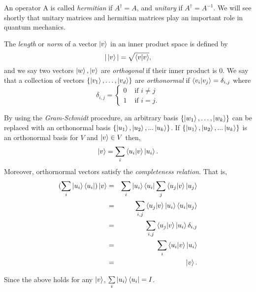 {An operator A is called \textit{hermitian} if $A^\dagger = A$, and \textit{unitary} if $A^\dagger =A^{-1}$. We will see shortly that unitary matrices and hermitian matrices play an important role in quantum mechanics.

The \textit{length} or \textit{norm} of a vector $\ket{v}$ in an inner product space is defined by
\begin{equation}
    |\ket{v}|=\sqrt{\braket{v|v}},
\end{equation}
and we say two vectors $\ket{w}, \ket{v}$ are \textit{orthogonal} if their inner product is 0.  We say that a collection of vectors $\{\ket{v_1},\hdots,\ket{v_d}\}$  are \textit{orthonormal} if $\braket{v_i | v_j}={\delta}_{i,j}$ where 
$${\delta}_{i,j}=
\begin{cases} 0 & \textrm{ if }i\neq j\\
1 & \textrm{ if } i=j.
\end{cases}$$


By using the \textit{Gram-Schmidt} procedure, an arbitrary basis $\{\ket{w_1},\hdots,\ket{w_k}\}$ can be replaced with an orthonormal basis $\{\ket{u_1}, \ket{u_2}, ...\ket{u_k}\}$.  If $\{\ket{u_1}, \ket{u_2}, ...\ket{u_k}\}$ is an orthonormal basis for $V$ and $\ket{v} \in V$ then, 
$$\ket{v}=\sum\limits_i\braket{u_i|v}\ket{u_i} .$$
Moreover, orthornormal vectors satisfy the \textit{completeness relation}.  That is, 
\begin{eqnarray*}
    (\sum_i \ket{u_i}\bra{u_i})\ket{v}&=&
    \sum_i \ket{u_i}\bra{u_i}\sum_j \braket{u_j|v} \ket{u_j}\\
    &=& \sum_{i,j}\braket{u_j|v}\ket{u_i}\braket{u_i|u_j}\\
    &=& \sum_{i,j}\braket{u_j|v}\ket{u_i}\delta_{i,j}\\
    &=&\sum_i \braket{u_i|v}\ket{u_i}\\
    &=&\ket{v}.
\end{eqnarray*}


Since the above holds for any $\ket{v}$, $\sum\limits_i \ket{u_i}\bra{u_i}=I$.




}
